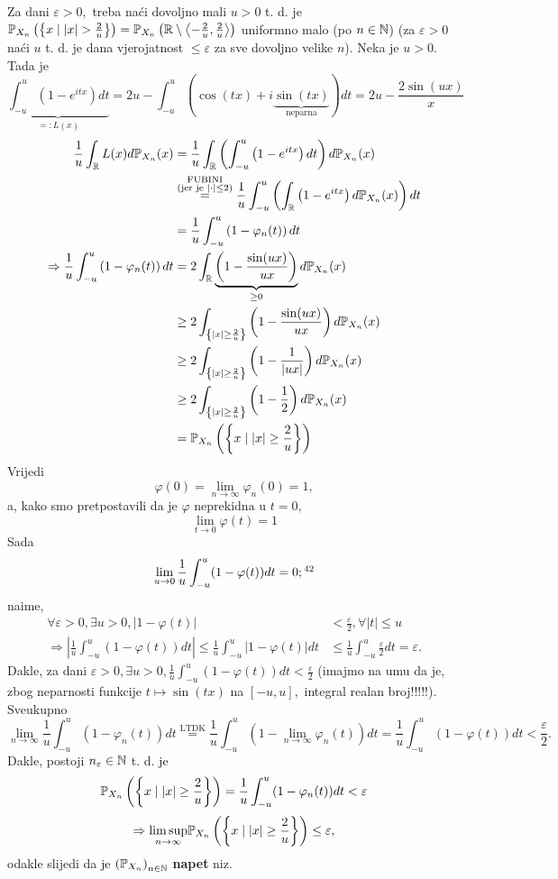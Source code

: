 \documentclass{article}
\newcommand{\mylimsup}{\underset{n\to\infty}{\lim\sup}}
\begin{document}
Za dani \(\varepsilon>0,\) treba naći dovoljno mali \(u>0\) t. d. je \(\Bbb P_{X_n}\left(\left\{x\mid |x|>\frac2u\right\}\right)=\Bbb P_{X_n}\left(\Bbb R\setminus\left\langle-\frac2u,\frac2u\right\rangle\right)\) uniformno malo (po \(n\in\Bbb N\)) (za \(\varepsilon>0\) naći \(u\) t. d. je dana vjerojatnost \(\le\varepsilon\) za sve dovoljno velike \(n\)). Neka je \(u>0.\) Tada je \[\underbrace{\int_{-u}^u\left(1-e^{itx}\right)dt}_{=:L(x)}=2u-\int_{-u}^u\left(\cos(tx)+i\underbrace{\sin(tx)}_{\text{neparna}}\right)dt=2u-\frac{2\sin(ux)}x\] \[\begin{aligned}\frac1u\int_\Bbb R L(x)d\Bbb P_{X_n}(x)&=\frac1u\int_\Bbb R\left(\int_{-u}^u\left(1-e^{itx}\right)dt\right)d\Bbb P_{X_n}(x)\\&\overset{\substack{\text{FUBINI}\\\text{(jer je }|\cdot|\le 2\text{)}}}{=}\frac1u\int_{-u}^u\left(\int_{\Bbb R}\left(1-e^{itx}\right)d\Bbb P_{X_n}(x)\right)dt\\&=\frac1u\int_{-u}^u\left(1-\varphi_n(t)\right)dt\\\Rightarrow\frac1u\int_{-u}^u\left(1-\varphi_n(t)\right)dt&=2\int_\Bbb R\underbrace{\left(1-\frac{\sin(ux)}{ux}\right)}_{\ge 0}d\Bbb P_{X_n}(x)\\&\ge2\int_{\left\{|x|\ge\frac2u\right\}}\left(1-\frac{\sin(ux)}{ux}\right)d\Bbb P_{X_n}(x)\\&\ge2\int_{\left\{|x|\ge\frac2u\right\}}\left(1-\frac1{|ux|}\right)d\Bbb P_{X_n}(x)\\&\ge2\int_{\left\{|x|\ge\frac2u\right\}}\left(1-\frac12\right)d\Bbb P_{X_n}(x)\\&=\Bbb P_{X_n}\left(\left\{x\mid |x|\ge\frac2u\right\}\right)\end{aligned}\] Vrijedi \[\varphi(0)=\lim_{n\to\infty}\varphi_n(0)=1,\] a, kako smo pretpostavili da je \(\varphi\) neprekidna u \(t=0,\) \[\lim_{t\to 0}\varphi(t)=1\] Sada\[\lim_{u\to 0}\frac1u\int_{-u}^u(1-\varphi(t))dt=0;\footnotemark[42]\] naime, \[\begin{aligned}\forall\varepsilon>0,\exists u>0,|1-\varphi(t)|&<\frac\varepsilon2,\forall |t|\le u\\\Rightarrow\left|\frac1u\int_{-u}^u(1-\varphi(t))dt\right|\le\frac1u\int_{-u}^u|1-\varphi(t)|dt&\le\frac1u\int_{-u}^u\frac\varepsilon2 dt=\varepsilon.\end{aligned}\] Dakle, za dani \(\varepsilon>0,\exists u>0,\frac1u\int_{-u}^u(1-\varphi(t))dt<\frac\varepsilon2\) (imajmo na umu da je, zbog neparnosti funkcije \(t\mapsto\sin(tx)\) na \([-u,u],\) integral realan broj!!!!!). Sveukupno \[\lim_{n\to\infty}\frac1u\int_{-u}^u\left(1-\varphi_n(t)\right)dt\overset{\text{LTDK}}{=}\frac1u\int_{-u}^u\left(1-\lim_{n\to\infty}\varphi_n(t)\right)dt=\frac1u\int_{-u}^u(1-\varphi(t))dt<\frac\varepsilon2.\] Dakle, postoji \(n_\varepsilon\in\Bbb N\) t. d. je \[\Bbb P_{X_n}\left(\left\{x\mid|x|\ge\frac2u\right\}\right)=\frac1u\int_{-u}^u(1-\varphi_n(t))dt<\varepsilon\] \[\Rightarrow\mylimsup \Bbb P_{X_n}\left(\left\{x\mid |x|\ge\frac2u\right\}\right)\le\varepsilon,\] odakle slijedi da je \(\left(\Bbb P_{X_n}\right)_{n\in\Bbb N}\) \textbf{napet} niz.
\newpage
\end{document}
